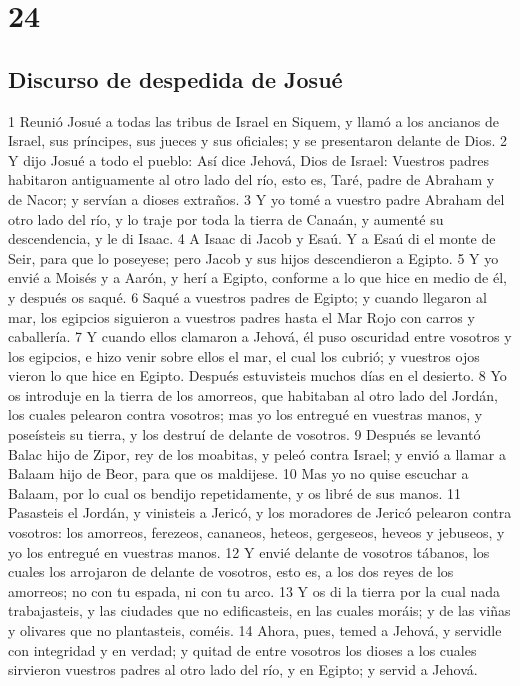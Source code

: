 \chapter{24}

\section*{Discurso de despedida de Josué}

1 Reunió Josué a todas las tribus de Israel en Siquem, y llamó a los ancianos de Israel, sus príncipes, sus jueces y sus oficiales; y se presentaron delante de Dios.
2 Y dijo Josué a todo el pueblo: Así dice Jehová, Dios de Israel: Vuestros padres habitaron antiguamente al otro lado del río, esto es, Taré, padre de Abraham y de Nacor; y servían a dioses extraños.
3 Y yo tomé a vuestro padre Abraham del otro lado del río, y lo traje por toda la tierra de Canaán, y aumenté su descendencia, y le di Isaac. 
4 A Isaac di Jacob y Esaú. Y a Esaú di el monte de Seir, para que lo poseyese; pero Jacob y sus hijos descendieron a Egipto. 
5 Y yo envié a Moisés y a Aarón, y herí a Egipto, conforme a lo que hice en medio de él, y después os saqué.
6 Saqué a vuestros padres de Egipto; y cuando llegaron al mar, los egipcios siguieron a vuestros padres hasta el Mar Rojo con carros y caballería.
7 Y cuando ellos clamaron a Jehová, él puso oscuridad entre vosotros y los egipcios, e hizo venir sobre ellos el mar, el cual los cubrió; y vuestros ojos vieron lo que hice en Egipto. Después estuvisteis muchos días en el desierto.
8 Yo os introduje en la tierra de los amorreos, que habitaban al otro lado del Jordán, los cuales pelearon contra vosotros; mas yo los entregué en vuestras manos, y poseísteis su tierra, y los destruí de delante de vosotros. 
9 Después se levantó Balac hijo de Zipor, rey de los moabitas, y peleó contra Israel; y envió a llamar a Balaam hijo de Beor, para que os maldijese.
10 Mas yo no quise escuchar a Balaam, por lo cual os bendijo repetidamente, y os libré de sus manos.
11 Pasasteis el Jordán, y vinisteis a Jericó, y los moradores de Jericó pelearon contra vosotros: los amorreos, ferezeos, cananeos, heteos, gergeseos, heveos y jebuseos, y yo los entregué en vuestras manos.
12 Y envié delante de vosotros tábanos, los cuales los arrojaron de delante de vosotros, esto es, a los dos reyes de los amorreos; no con tu espada, ni con tu arco.
13 Y os di la tierra por la cual nada trabajasteis, y las ciudades que no edificasteis, en las cuales moráis; y de las viñas y olivares que no plantasteis, coméis. 
14 Ahora, pues, temed a Jehová, y servidle con integridad y en verdad; y quitad de entre vosotros los dioses a los cuales sirvieron vuestros padres al otro lado del río, y en Egipto; y servid a Jehová.

